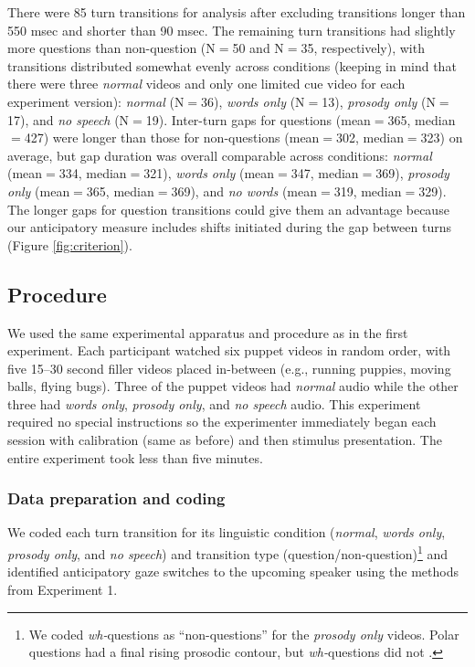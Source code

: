 \documentclass[authoryear, 12pt]{elsarticle}
\begin{document}
There were 85 turn transitions for analysis after excluding transitions longer than 550 msec and shorter than 90 msec. The remaining turn transitions had slightly more questions than non-question (N$=$50 and N$=$35, respectively), with transitions distributed somewhat evenly across conditions (keeping in mind that there were three \textit{normal} videos and only one limited cue video for each experiment version): \textit{normal} (N$=$36), \textit{words only} (N$=$13), \textit{prosody only} (N$=$17), and \textit{no speech} (N$=$19). Inter-turn gaps for questions (mean$=$365, median$=$427) were longer than those for non-questions (mean$=$302, median$=$323) on average, but gap duration was overall comparable across conditions: \textit{normal} (mean$=$334, median$=$321), \textit{words only} (mean$=$347, median$=$369), \textit{prosody only} (mean$=$365, median$=$369), and \textit{no words} (mean$=$319, median$=$329). The longer gaps for question transitions could give them an advantage because our anticipatory measure includes shifts initiated during the gap between turns (Figure \ref{fig:criterion}).

\subsection{Procedure}
We used the same experimental apparatus and procedure as in the first experiment. Each participant watched six puppet videos in random order, with five 15--30 second filler videos placed in-between (e.g., running puppies, moving balls, flying bugs). Three of the puppet videos had \textit{normal} audio while the other three had \textit{words only}, \textit{prosody only}, and \textit{no speech} audio. This experiment required no special instructions so the experimenter immediately began each session with calibration (same as before) and then stimulus presentation. The entire experiment took less than five minutes.

\subsubsection{Data preparation and coding}
We coded each turn transition for its linguistic condition (\textit{normal}, \textit{words only}, \textit{prosody only}, and \textit{no speech}) and transition type (question/non-question)\footnote{We coded \textit{wh-}questions as ``non-questions'' for the \textit{prosody only} videos. Polar questions had a final rising prosodic contour, but \textit{wh-}questions did not  \citep{hedberg2010}.} and identified anticipatory gaze switches to the upcoming speaker using the methods from Experiment 1.
\end{document}
